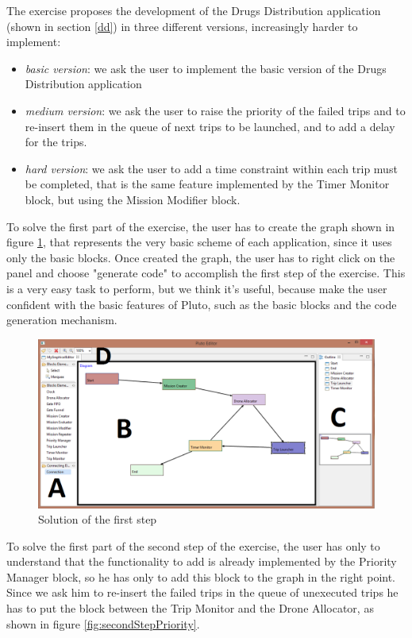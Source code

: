 The exercise proposes the development of the Drugs Distribution application (shown in section \ref{dd}) in three different versions, increasingly harder to implement:

\begin{itemize}
\itemsep2pt
\item{
\textit{basic version}: we ask the user to implement the basic version of the Drugs Distribution application
}
\item{
\textit{medium version}: we ask the user to raise the priority of the failed trips and to re-insert them in the queue of next trips to be launched, and to add a delay for the trips.
}
\item{
\textit{hard version}: we ask the user to add a time constraint within each trip must be completed, that is the same feature implemented by the Timer Monitor block, but using the Mission Modifier block.
}
\end{itemize}

To solve the first part of the exercise, the user has to create the graph shown in figure \ref{fig:firstStep}, that represents the very basic scheme of each application, since it uses only the basic blocks.
Once created the graph, the user has to right click on the panel and choose "generate code" to accomplish the first step of the exercise.
This is a very easy task to perform, but we think it's useful, because make the user confident with the basic features of Pluto, such as the basic blocks and the code generation mechanism.


\begin{figure}[htb]
  \centering
  \includegraphics[width=\linewidth]{pictures/EditorScreen.png}
  \caption{Solution of the first step}
  \label{fig:firstStep}
\end{figure}

\newpage

To solve the first part of the second step of the exercise, the user has only to understand that the functionality to add is already implemented by the Priority Manager block, so he has only to add this block to the graph in the right point.
Since we ask him to re-insert the failed trips in the queue of unexecuted trips he has to put the block between the Trip Monitor and the Drone Allocator, as shown in figure \ref{fig:secondStepPriority}.

